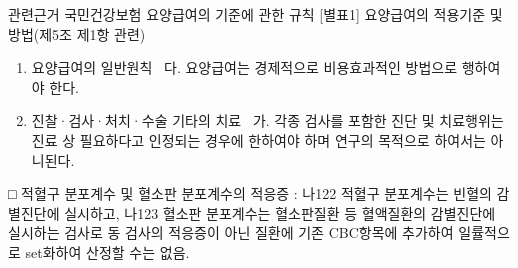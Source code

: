 \begin{commentbox}{관련근거}
국민건강보험 요양급여의 기준에 관한 규칙 [별표1] 요양급여의 적용기준 및 방법(제5조 제1항 관련)
\begin{enumerate}[1.]\tightlist
\item 요양급여의 일반원칙  다. 요양급여는 경제적으로 비용효과적인 방법으로 행하여야 한다.
\item 진찰·검사·처치·수술 기타의 치료  가. 각종 검사를 포함한 진단 및 치료행위는 진료 상 필요하다고 인정되는 경우에 한하여야 하며 연구의 목적으로 하여서는 아니된다.
\end{enumerate}
□ 적혈구 분포계수 및 혈소판 분포계수의 적응증 : 나122 적혈구 분포계수는 빈혈의 감별진단에 실시하고, 나123 혈소판 분포계수는 혈소판질환 등 혈액질환의 감별진단에 실시하는 검사로 동 검사의 적응증이 아닌 질환에 기존 CBC항목에 추가하여 일률적으로 set화하여 산정할 수는 없음.
\end{commentbox}
\prezi{\clearpage}
